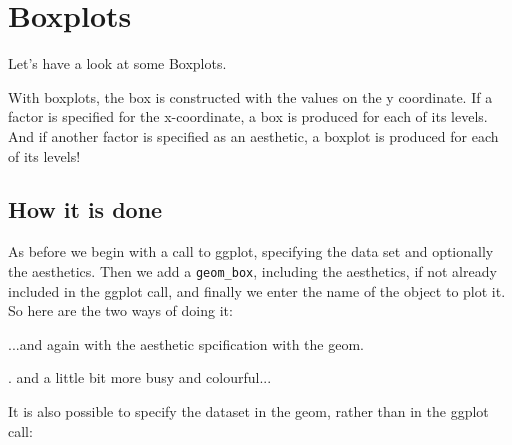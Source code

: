 \documentclass[titlepage]{book}\usepackage{knitr}
\begin{document}
\section{ Boxplots} 
Let's have a look at some Boxplots. 

With boxplots, the box is constructed with the values on the y coordinate.  If a factor is specified for the x-coordinate, a box is produced for each of its levels.  And if another factor is specified as an aesthetic, a boxplot is produced for each of its levels!

\subsection{How it is done}
As before we begin with a call to ggplot, specifying the data set and optionally the aesthetics.
Then we add a \texttt{geom\_box}, including the aesthetics, if not already included in the ggplot call, and finally we enter the name of the object to plot it.
So here are the two ways of doing it:

\begin{knitrout}
\color{fgcolor}\begin{kframe}
\begin{alltt}
 \hlkwb{<-}  \hlstd{(}       \hlopt{+}
      \hlstd{()}
\end{alltt}
\end{kframe}
\end{knitrout}

...and again with the aesthetic spcification with the geom.
\begin{knitrout}
\color{fgcolor}\begin{kframe}
\begin{alltt}
 \hlkwb{<-}  \hlopt{+}
      \hlstd{(}\hlstd{(}      
\end{alltt}
\end{kframe}
\end{knitrout}

. and a little bit more busy and colourful...

\begin{knitrout}
\color{fgcolor}\begin{kframe}
\begin{alltt}
 \hlkwb{<-}  \hlstd{(}       \hlopt{+} \hlstd{()}
\end{alltt}
\end{kframe}
\end{knitrout}
It is also possible to specify the dataset in the geom, rather than in the ggplot call:
\end{document}
